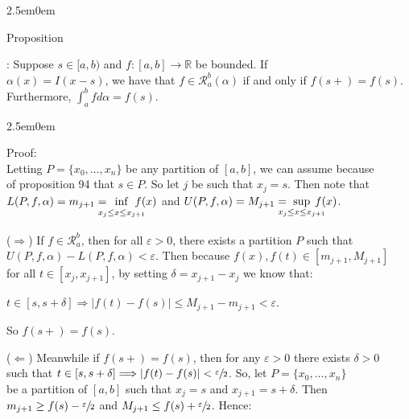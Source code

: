 \documentclass{book}
\newcommand{\hTwo}{%
   \color{MidnightBlue}%
   \fontsize{13}{15}\selectfont%
}
\newcommand{\hThree}{%
   \color{PineGreen!85!Orange}
   \fontsize{13}{15}\selectfont%
}
\newenvironment{myIndent}{%
   \begin{adjustwidth}{2.5em}{0em}%
}{%
   \end{adjustwidth}%
}
\newcounter{PropNumber}
\newcommand{\propCount}[1][1]{%
   \addtocounter{PropNumber}{#1}%
   \thePropNumber%
}
\newcommand{\retTwo}{\hfill\bigbreak}
\begin{document}
{\begin{myIndent}\hTwo
   Proposition \propCount: Suppose $s \in [a, b)$ and $f: [a, b] \longrightarrow \mathbb{R}$ be bounded. If\\ $\alpha(x) = I(x - s)$, we have that $f \in \mathscr{R}_a^b(\alpha)$ if and only if $f(s+) = f(s)$.\\ Furthermore, $\int_a^bfd\alpha = f(s)$.\\ [-6pt]

   {\begin{myIndent}\hThree
      Proof:\\
      Letting $P = \{x_0, \ldots, x_n\}$ be any partition of $[a, b]$, we can assume because\\ of proposition 94 that $s \in P$. So let $j$ be such that $x_j = s$. Then note that\\ $L(P, f, \alpha) = m_{j+1} = \hspace{-1.05em}\inf\limits_{x_j \leq x \vphantom{\int^a}\leq x_{j+1}}\hspace{-1.1em}f(x)$ and $U(P, f, \alpha) = M_{j+1} = \hspace{-1.05em}\sup\limits_{x_j \leq x \leq x_{j+1}}\hspace{-1.1em}f(x)$.\retTwo

      ($\Longrightarrow$) If $f \in \mathscr{R}_a^b$, then for all $\varepsilon > 0$, there exists a partition $P$ such that\\ $U(P, f, \alpha) - L(P, f, \alpha) < \varepsilon$. Then because $f(x), f(t) \in [m_{j+1}, M_{j+1}]$\\ for all $t \in [x_j, x_{j+1}]$, by setting $\delta = x_{j+1} - x_j$ we know that:
      
      {\centering$t \in [s, s + \delta] \Longrightarrow |f(t) - f(s)| \leq M_{j+1} - m_{j+1} < \varepsilon$.\retTwo\par}

      So $f(s+) = f(s)$.\retTwo

      ($\Longleftarrow$) Meanwhile if $f(s+) = f(s)$, then for any $\varepsilon > 0$ there exists $\delta > 0$\\ such that $t \in [s, s + \delta] \Longrightarrow |f(t) - f(s)| < \sfrac{\varepsilon}{2}$. So, let $P = \{x_0, \ldots, x_n\}$\\ be a partition of $[a, b]$ such that $x_j = s$ and $x_{j+1} = s + \delta$. Then\\ $m_{j+1} \geq f(s) - \sfrac{\varepsilon}{2}$ and $M_{j+1} \leq f(s) + \sfrac{\varepsilon}{2}$. Hence:


\end{myIndent}}
\end{myIndent}}
\end{document}
